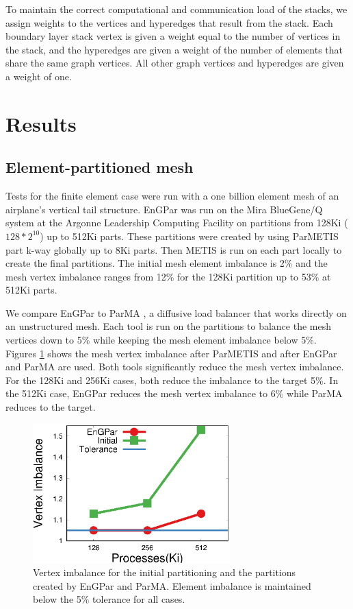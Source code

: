 \documentclass[conference]{IEEEtran}
\begin{document}
To maintain the correct computational and communication load of the stacks,
we assign weights to the vertices and hyperedges that result from the stack. Each boundary layer
stack vertex is given a weight equal to the number of vertices in the stack, and the hyperedges
are given a weight of the number of elements that share the same graph vertices. All other
graph vertices and hyperedges are given a weight of one.


\section{Results} \label{sec:results}

\subsection{Element-partitioned mesh}

Tests for the finite element case were run with a one billion element mesh of an airplane's
vertical tail structure. EnGPar was run on the Mira BlueGene/Q system at the Argonne Leadership
Computing Facility \cite{haring2012ibm} on partitions from 128Ki ($128*2^{10}$) up to 512Ki parts.
These partitions were created by using ParMETIS part k-way \cite{karypis1999parallel} globally
up to 8Ki parts. Then METIS is run on each part locally to create the final partitions.
The initial mesh element imbalance is 2\% and the mesh vertex imbalance ranges from 12\% for
the 128Ki partition up to 53\% at 512Ki parts.

We compare EnGPar to ParMA \cite{SmithParma2015}, a diffusive load balancer that
works directly on an unstructured mesh.
Each tool is run on the partitions to balance the mesh vertices down to 5\% while keeping the mesh
element imbalance below 5\%. Figures \ref{fig:fem_vtximb} shows the mesh vertex imbalance after
ParMETIS and after EnGPar and ParMA are used. Both tools significantly reduce the mesh vertex
imbalance. For the 128Ki and 256Ki cases, both reduce the imbalance to the target 5\%. In
the 512Ki case, EnGPar reduces the mesh vertex imbalance to 6\% while ParMA reduces to the
target.

\begin{figure}[!ht]
  \centering
  \includegraphics[width=3in]{plots/mira_fem_results/vimb_v_cores}
  \caption{Vertex imbalance for the initial partitioning and the partitions created by
    EnGPar and ParMA. Element imbalance is maintained below the 5\% tolerance for all cases.}
  \label{fig:fem_vtximb}
\end{figure}
\end{document}
